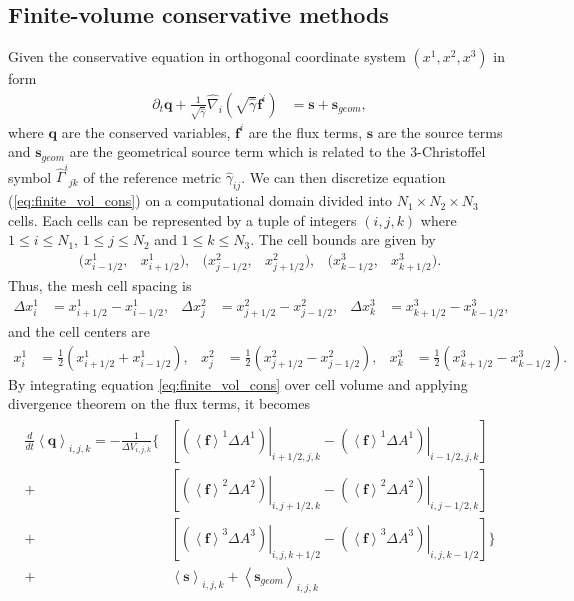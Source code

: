 \subsection{Finite-volume conservative methods}\label{section3.1.1}
Given the conservative equation in orthogonal coordinate system $(x^1, x^2, x^3)$ in form
\begin{align}\label{eq:finite_vol_cons}
    \partial_t \mathbf{q} + \frac{1}{\sqrt{\hat{\gamma}}}\hat{\nabla}_i \left( \sqrt{\hat{\gamma}} \mathbf{f}^i \right)
    &= \mathbf{s} + \mathbf{s}_{geom},
\end{align}
where $\mathbf{q}$ are the conserved variables,
$\mathbf{f}^i$ are the flux terms, $\mathbf{s}$ are the source terms
and $\mathbf{s}_{geom}$ are the geometrical source term which is related to the 3-Christoffel symbol
$\hat{\Gamma}^i{}_{jk}$ of the reference metric $\hat{\gamma}_{ij}$.
We can then discretize equation (\ref{eq:finite_vol_cons}) on a computational domain divided into $N_1 \times N_2 \times N_3$ cells.
Each cells can be represented by a tuple of integers $(i,j,k)$ where $1 \leq i \leq N_1$, $1 \leq j \leq N_2$ and $1 \leq k \leq N_3$.
The cell bounds are given by
\begin{align}
    (x^1_{i-1/2}, &x^1_{i+1/2}), & (x^2_{j-1/2}, &x^2_{j+1/2}), & (x^3_{k-1/2}, &x^3_{k+1/2}).
\end{align}
Thus, the mesh cell spacing is
\begin{align}
    \Delta x^1_i &= x^1_{i+1/2} - x^1_{i-1/2}, & \Delta x^2_j &= x^2_{j+1/2}- x^2_{j-1/2}, & \Delta x^3_k &= x^3_{k+1/2} - x^3_{k-1/2},
\end{align}
and the cell centers are
\begin{align}
    x^1_i &= \frac{1}{2} \left(x^1_{i+1/2} + x^1_{i-1/2}\right), & x^2_j &= \frac{1}{2} \left( x^2_{j+1/2}- x^2_{j-1/2} \right), 
    & x^3_k &= \frac{1}{2} \left( x^3_{k+1/2} - x^3_{k-1/2} \right).
\end{align}
By integrating equation \ref{eq:finite_vol_cons} over cell volume and applying divergence theorem on the flux terms,
it becomes
\begin{align}
    \begin{split}
    \frac{d}{dt} \left\langle \mathbf{q} \right\rangle_{i,j,k} = - \frac{1}{\Delta V_{i,j,k}} \bigg\{ &\left[
    \left. \left( \left\langle \mathbf{f} \right\rangle^1 \Delta A^1 \right) \right|_{i+1/2,j,k} -
    \left. \left( \left\langle \mathbf{f} \right\rangle^1 \Delta A^1 \right) \right|_{i-1/2,j,k} \right] \\
    + &\left[
    \left. \left( \left\langle \mathbf{f} \right\rangle^2 \Delta A^2 \right) \right|_{i,j+1/2,k} -
    \left. \left( \left\langle \mathbf{f} \right\rangle^2 \Delta A^2 \right) \right|_{i,j-1/2,k} \right] \\
    + &\left[
    \left. \left( \left\langle \mathbf{f} \right\rangle^3 \Delta A^3 \right) \right|_{i,j,k+1/2} -
    \left. \left( \left\langle \mathbf{f} \right\rangle^3 \Delta A^3 \right) \right|_{i,j,k-1/2} \right] \bigg\} \\
    + &\left\langle \mathbf{s} \right\rangle_{i,j,k}
    + \left\langle \mathbf{s}_{geom} \right\rangle_{i,j,k}
    \end{split}
\end{align}
